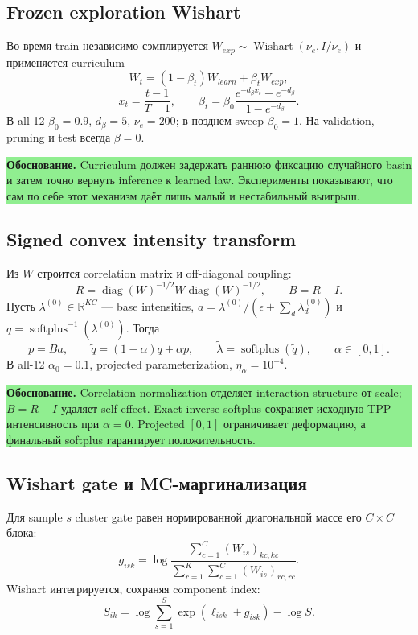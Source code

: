 \documentclass[11pt,a4paper]{article}
\newcommand{\R}{\mathbb{R}}
\newcommand{\boxnote}[2]{%
  \begin{center}\setlength{\fboxsep}{9pt}%
  \colorbox{#1}{\begin{minipage}{0.94\textwidth}\raggedright #2\par\end{minipage}}
  \end{center}}
\newcommand{\rationale}[1]{\boxnote{lightgreen}{\textbf{Обоснование.} #1}}
\begin{document}
\subsection{Frozen exploration Wishart}

Во время train независимо сэмплируется
$W_{exp}\sim\operatorname{Wishart}(\nu_e,I/\nu_e)$ и применяется curriculum
\[
W_t=(1-\beta_t)W_{learn}+\beta_tW_{exp},
\]
\[
x_t=\frac{t-1}{T-1},\qquad
\beta_t=\beta_0\frac{e^{-d_\beta x_t}-e^{-d_\beta}}
{1-e^{-d_\beta}}.
\]
В all-12 $\beta_0=0.9$, $d_\beta=5$, $\nu_e=200$; в позднем sweep
$\beta_0=1$. На validation, pruning и test всегда $\beta=0$.

\rationale{Curriculum должен задержать раннюю фиксацию случайного basin и затем
точно вернуть inference к learned law. Эксперименты показывают, что сам по себе
этот механизм даёт лишь малый и нестабильный выигрыш.}

\subsection{Signed convex intensity transform}

Из $W$ строится correlation matrix и off-diagonal coupling:
\[
R=\operatorname{diag}(W)^{-1/2}W\operatorname{diag}(W)^{-1/2},
\qquad B=R-I.
\]
Пусть $\lambda^{(0)}\in\R_+^{KC}$ --- base intensities,
$a=\lambda^{(0)}/(\epsilon+\sum_d\lambda_d^{(0)})$ и
$q=\operatorname{softplus}^{-1}(\lambda^{(0)})$. Тогда
\[
p=Ba,\qquad
\widetilde q=(1-\alpha)q+\alpha p,
\qquad
\widetilde\lambda=\operatorname{softplus}(\widetilde q),
\qquad \alpha\in[0,1].
\]
В all-12 $\alpha_0=0.1$, projected parameterization, $\eta_\alpha=10^{-4}$.

\rationale{Correlation normalization отделяет interaction structure от scale;
$B=R-I$ удаляет self-effect. Exact inverse softplus сохраняет исходную TPP
интенсивность при $\alpha=0$. Projected $[0,1]$ ограничивает деформацию, а
финальный softplus гарантирует положительность.}

\subsection{Wishart gate и MC-маргинализация}

Для sample $s$ cluster gate равен нормированной диагональной массе его
$C\times C$ блока:
\[
g_{isk}=\log\frac{\sum_{c=1}^{C}(W_{is})_{kc,kc}}
{\sum_{r=1}^{K}\sum_{c=1}^{C}(W_{is})_{rc,rc}}.
\]
Wishart интегрируется, сохраняя component index:
\[
S_{ik}=\log\sum_{s=1}^{S}\exp(\ell_{isk}+g_{isk})-\log S.
\]
\end{document}
